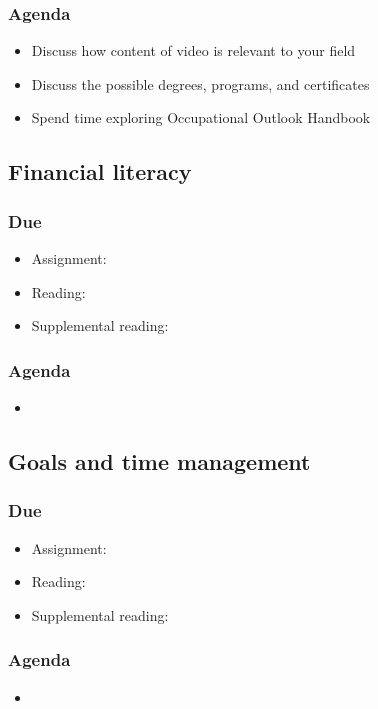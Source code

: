 \documentclass[12pt,article,oneside]{memoir}
\begin{document}
\subsubsection{Agenda}
\begin{itemize}
 \item Discuss how content of video is relevant to your field
 \item Discuss the possible degrees, programs, and certificates
 \item Spend time exploring Occupational Outlook Handbook
\end{itemize}



\subsection{Financial literacy}
\subsubsection{Due}
\begin{itemize}
 \item Assignment: 
 \item Reading: \cite{finra}
 \item Supplemental reading:
\end{itemize}

\subsubsection{Agenda}
\begin{itemize}
\item 
\end{itemize}



\subsection{Goals and time management}
\subsubsection{Due}
\begin{itemize}
 \item Assignment: 
 \item Reading:
 \item Supplemental reading:
\end{itemize}

\subsubsection{Agenda}
\begin{itemize}
\item 
\end{itemize}
\end{document}
